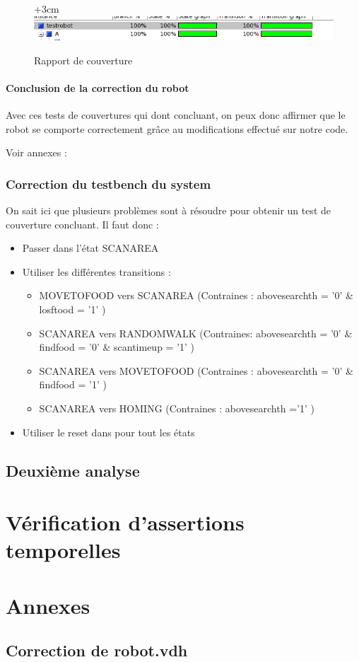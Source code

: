 \documentclass{article}
\begin{document}
\begin{figure}[!h]
\advance\leftskip+3cm
\includegraphics[scale=0.7]{PremiereCorrection/resultats.PNG}
\caption{Rapport de couverture}
\label{graphe-robot}
\end{figure}

\paragraph{Conclusion de la correction du robot}
Avec ces tests de couvertures qui dont concluant, on peux donc affirmer que le robot se comporte correctement grâce au modifications effectué sur notre code.

Voir annexes : 

\subsubsection{Correction du testbench du system}

On sait ici que plusieurs problèmes sont à résoudre pour obtenir un test de couverture concluant. Il faut donc : 
\begin{itemize}
\item Passer dans l'état SCANAREA
\item Utiliser les différentes transitions :
	\begin{itemize}
	\item MOVETOFOOD vers SCANAREA (Contraines : abovesearchth = '0' \& losftood = '1' )
	\item SCANAREA vers RANDOMWALK (Contraines: abovesearchth = '0' \& findfood = '0' \& scantimeup = '1'  )
	\item SCANAREA vers MOVETOFOOD (Contraines : abovesearchth = '0' \& findfood = '1' )
	\item SCANAREA vers HOMING (Contraines : abovesearchth ='1' )
	\end{itemize}
\item Utiliser le reset dans pour tout les états
\end{itemize}

\subsection{Deuxième analyse}


\section{Vérification d'assertions temporelles}

\section{Annexes}
\subsection{Correction de robot.vdh}
 
\end{document}
